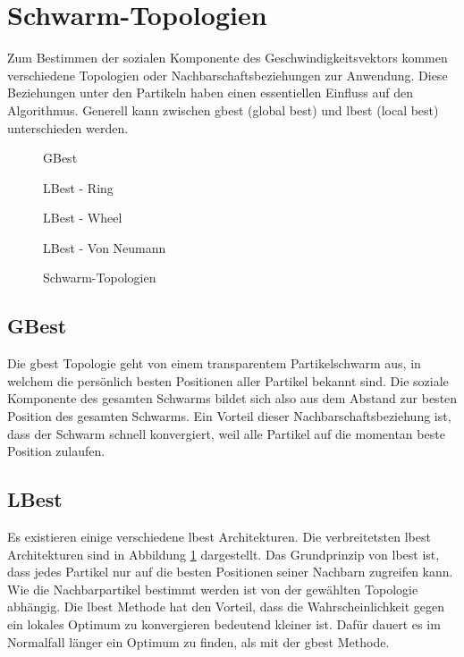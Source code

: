 \section{Schwarm-Topologien}
Zum Bestimmen der sozialen Komponente des Geschwindigkeitsvektors kommen verschiedene Topologien oder Nachbarschaftsbeziehungen zur Anwendung. Diese Beziehungen unter den Partikeln haben einen essentiellen Einfluss auf den Algorithmus. Generell kann zwischen gbest (global best) und lbest (local best) unterschieden werden.

\begin{figure}[htbp]
	\centering
	\begin{minipage}{4cm}
		\centering
		
		GBest
	\end{minipage}
	\begin{minipage}{4cm}
		\centering
		
		LBest - Ring
	\end{minipage}
	\begin{minipage}{4cm}
		\centering
		
		LBest - Wheel
	\end{minipage}
	\begin{minipage}{4cm}
		\centering
		
		LBest - Von Neumann
	\end{minipage}
	\caption{Schwarm-Topologien}
	\label{schwarm-topologien}
\end{figure}

\subsection{GBest}
Die gbest Topologie geht von einem transparentem Partikelschwarm aus, in welchem die persönlich besten Positionen aller Partikel bekannt sind. Die soziale Komponente des gesamten Schwarms bildet sich also aus dem Abstand zur besten Position des gesamten Schwarms. Ein Vorteil dieser Nachbarschaftsbeziehung ist, dass der Schwarm schnell konvergiert, weil alle Partikel auf die momentan beste Position zulaufen.

\subsection{LBest}
Es existieren einige verschiedene lbest Architekturen. Die verbreitetsten lbest Architekturen sind in Abbildung \ref{schwarm-topologien} dargestellt. Das Grundprinzip von lbest ist, dass jedes Partikel nur auf die besten Positionen seiner Nachbarn zugreifen kann. Wie die Nachbarpartikel bestimmt werden ist von der gewählten Topologie abhängig. Die lbest Methode hat den Vorteil, dass die Wahrscheinlichkeit gegen ein lokales Optimum zu konvergieren bedeutend kleiner ist. Dafür dauert es im Normalfall länger ein Optimum zu finden, als mit der gbest Methode.

